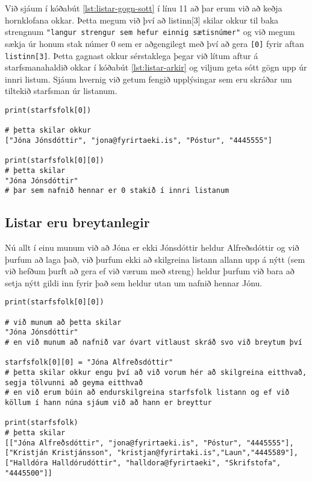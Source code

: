 Við sjáum í kóðabút \ref{lst:listar-gogn-sott} í línu 11 að þar erum við að keðja hornklofana okkar.
Þetta megum við því að listinn[3] skilar okkur til baka strengnum \texttt{"langur strengur sem hefur einnig sætisnúmer"} og við megum sækja úr honum stak númer 0 sem er aðgengilegt með því að gera \texttt{[0]} fyrir aftan \texttt{listinn[3]}.
Þetta gagnast okkur sérstaklega þegar við lítum aftur á starfsmanahaldið okkar í kóðabút \ref{lst:listar-arkir} og viljum geta sótt gögn upp úr innri listum.
Sjáum hvernig við getum fengið upplýsingar sem eru skráðar um tiltekið starfsman úr listanum.

\begin{lstlisting}[caption=Unnið með gögn úr lista, label=lst:listar-gagnanotkun]
print(starfsfolk[0])

# þetta skilar okkur 
["Jóna Jónsdóttir", "jona@fyrirtaeki.is", "Póstur", "4445555"]

print(starfsfolk[0][0])
# þetta skilar
"Jóna Jónsdóttir"
# þar sem nafnið hennar er 0 stakið í innri listanum
\end{lstlisting}

\subsection{Listar eru breytanlegir}
Nú allt í einu munum við að Jóna er ekki Jónsdóttir heldur Alfreðsdóttir og við þurfum að laga það, við þurfum ekki að skilgreina listann allann upp á nýtt (sem við hefðum þurft að gera ef við værum með streng) heldur þurfum við bara að setja nýtt gildi inn fyrir það sem heldur utan um nafnið hennar Jónu.

\begin{lstlisting}[caption=Unnið með gögn úr lista, label=lst:listar-gagnabreyting]
print(starfsfolk[0][0])

# við munum að þetta skilar 
"Jóna Jónsdóttir"
# en við munum að nafnið var óvart vitlaust skráð svo við breytum því

starfsfolk[0][0] = "Jóna Alfreðsdóttir"
# þetta skilar okkur engu því að við vorum hér að skilgreina eitthvað, segja tölvunni að geyma eitthvað
# en við erum búin að endurskilgreina starfsfolk listann og ef við köllum í hann núna sjáum við að hann er breyttur

print(starfsfolk) 
# þetta skilar 
[["Jóna Alfreðsdóttir", "jona@fyrirtaeki.is", "Póstur", "4445555"], ["Kristján Kristjánsson", "kristjan@fyrirtaki.is","Laun","4445589"], ["Halldóra Halldórudóttir", "halldora@fyrirtaeki", "Skrifstofa", "4445500"]]
\end{lstlisting}

